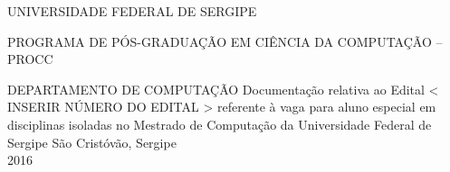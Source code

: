 \begin{titlepage}
\pagestyle{fancy}

\begin{center}
{\Large UNIVERSIDADE FEDERAL DE SERGIPE}
\par
\vspace{12pt}
{\Large PROGRAMA DE PÓS-GRADUAÇÃO EM CIÊNCIA DA COMPUTAÇÃO -- PROCC}
\par
\vspace{12pt}
{\Large DEPARTAMENTO DE COMPUTAÇÃO}
\vfill
{\Large Documentação relativa ao Edital < INSERIR NÚMERO DO EDITAL > referente à vaga para aluno especial em disciplinas isoladas no Mestrado de Computação da Universidade Federal de Sergipe}
\vfill
{}
\vfill
{\large São Cristóvão, Sergipe}\\
{\large 2016}
\end{center}
\end{titlepage}

